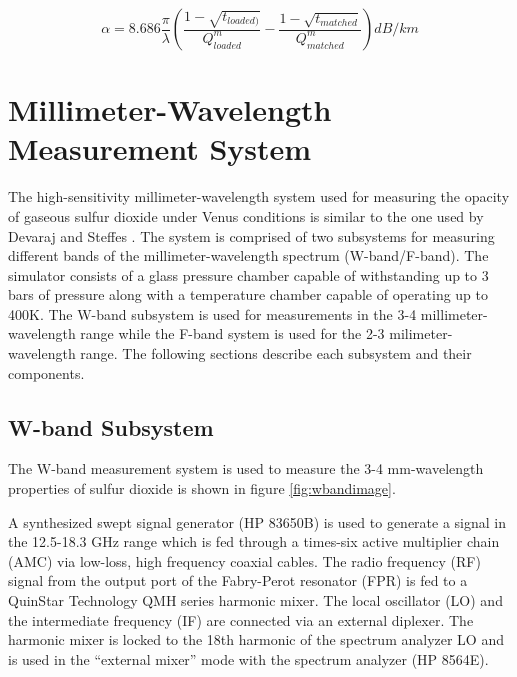 \begin{equation} \label{eq:alphamatch}
\alpha = 8.686 \frac{\pi}{\lambda}\left(\frac{1 - \sqrt{t_{loaded)}}}{Q^m_{loaded}} - \frac{1-\sqrt{t_{matched}}}{Q_{matched}^m} \right) dB/km
\end{equation}

\section{Millimeter-Wavelength Measurement System}

The high-sensitivity millimeter-wavelength system used for measuring the opacity of gaseous sulfur dioxide under Venus conditions is similar to the one used by Devaraj and Steffes \cite{system-description} \cite{Devaraj-thesis}. The system is comprised of two subsystems for measuring different bands of the millimeter-wavelength spectrum (W-band/F-band). The simulator consists of a glass pressure chamber capable of withstanding up to 3 bars of pressure along with a temperature chamber capable of operating up to 400K. The W-band subsystem is used for measurements in the 3-4 millimeter-wavelength range while the F-band system is used for the 2-3 milimeter-wavelength range. The following sections describe each subsystem and their components. 

\subsection{W-band Subsystem}

The W-band measurement system is used to measure the 3-4 mm-wavelength properties of sulfur dioxide is shown in figure \ref{fig:wbandimage}.

A synthesized swept signal generator (HP 83650B) is used to generate a signal in the 12.5-18.3 GHz range which is fed through a times-six active multiplier chain (AMC) via low-loss, high frequency coaxial cables. The radio frequency (RF) signal from the output port of the Fabry-Perot resonator (FPR) is fed to a QuinStar Technology QMH series harmonic mixer. The local oscillator (LO) and the intermediate frequency (IF) are connected via an external diplexer. The harmonic mixer is locked to the 18th harmonic of the spectrum analyzer LO and is used in the ``external mixer'' mode with the spectrum analyzer (HP 8564E). 

